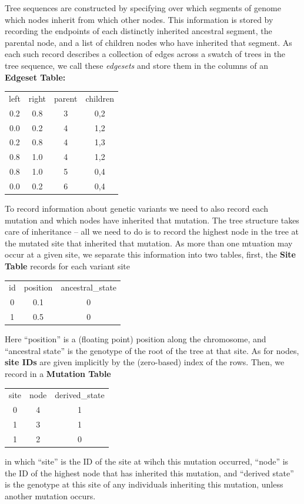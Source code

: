 \documentclass{article}
\newcommand{\plr}[1]{{\em \color{blue} #1}}
\begin{document}
Tree sequences are constructed by specifying over which segments of genome
which nodes inherit from which other nodes.  This information is stored by
recording the endpoints of each distinctly inherited ancestral segment,
the parental node, and a list of children nodes who have inherited that segment.
As each such record describes a collection of edges across a swatch of trees in the tree sequence,
we call these \emph{edgesets}
and store them in the columns of an \textbf{Edgeset Table:}
\begin{center}
\begin{tabular}{cccc}
    left & right & parent & children \\
    0.2  &  0.8  &  3     & 0,2 \\
    0.0  &  0.2  &  4     & 1,2 \\
    0.2  &  0.8  &  4     & 1,3 \\
    0.8  &  1.0  &  4     & 1,2 \\
    0.8  &  1.0  &  5     & 0,4 \\
    0.0  &  0.2  &  6     & 0,4  \\
\end{tabular}
\end{center}

To record information about genetic variants we need to also record each mutation
and which nodes have inherited that mutation.
The tree structure takes care of inheritance -- all we need to do
is to record the highest node in the tree at the mutated site
that inherited that mutation.
As more than one mtuation may occur at a given site,
we separate this information into two tables,
first, the \textbf{Site Table} records for each variant site
\begin{center}
\begin{tabular}{ccc}
    id  &   position  & ancestral\_state \\
    0   &  0.1        & 0 \\
    1   &  0.5        & 0 \\
\end{tabular}
\end{center}
Here ``position'' is a (floating point) position along the chromosome,
and ``ancestral state'' is the genotype of the root of the tree at that site.
As for nodes, \textbf{site IDs} are given implicitly
by the (zero-based) index of the rows.
Then, we record in a \textbf{Mutation Table}
\begin{center}
\begin{tabular}{ccc}
    site  & node  & derived\_state \\
    0	  & 4	  & 1 \\
    1	  & 3	  & 1 \\
    1	  & 2	  & 0 \\
\end{tabular}
\end{center}
in which ``site'' is the ID of the site at wihch this mutation occurred,
``node'' is the ID of the highest node that has inherited this mutation,
and ``derived state'' is the genotype at this site of any individuals inheriting this mutation,
unless another mutation occurs.
\end{document}
